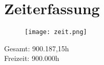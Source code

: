 \chapter*{Zeiterfassung}

\begin{figure}[H]
	\texttt{[image: zeit.png]}
\end{figure}
Gesamt: 900.187,15h\\
Freizeit: 900.000h
~ \\
\newpage
